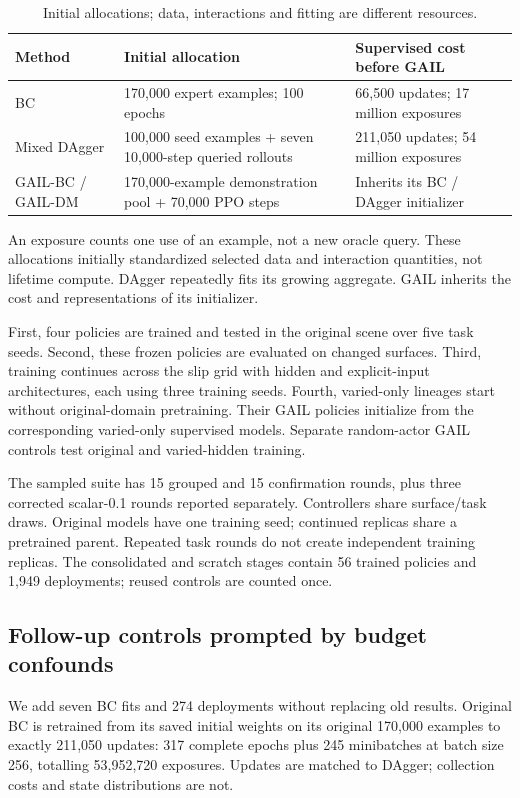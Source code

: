 \documentclass[conference]{IEEEtran}
\begin{document}
\begin{table}[t]\centering\small
\caption{Initial allocations; data, interactions and fitting are different resources.}
\begin{tabularx}{\textwidth}{lXX}\toprule
Method & Initial allocation & Supervised cost before GAIL \\
\midrule
BC & 170,000 expert examples; 100 epochs & 66,500 updates; 17 million exposures \\
Mixed DAgger & 100,000 seed examples + seven 10,000-step queried rollouts & 211,050 updates; 54 million exposures \\
GAIL-BC / GAIL-DM & 170,000-example demonstration pool + 70,000 PPO steps & Inherits its BC / DAgger initializer \\
\bottomrule\end{tabularx}\end{table}

An exposure counts one use of an example, not a new oracle query. These allocations initially standardized selected data and interaction quantities, not lifetime compute. DAgger repeatedly fits its growing aggregate. GAIL inherits the cost and representations of its initializer.

First, four policies are trained and tested in the original scene over five task seeds. Second, these frozen policies are evaluated on changed surfaces. Third, training continues across the slip grid with hidden and explicit-input architectures, each using three training seeds. Fourth, varied-only lineages start without original-domain pretraining. Their GAIL policies initialize from the corresponding varied-only supervised models. Separate random-actor GAIL controls test original and varied-hidden training.

The sampled suite has 15 grouped and 15 confirmation rounds, plus three corrected scalar-0.1 rounds reported separately. Controllers share surface/task draws. Original models have one training seed; continued replicas share a pretrained parent. Repeated task rounds do not create independent training replicas. The consolidated and scratch stages contain 56 trained policies and 1,949 deployments; reused controls are counted once.

\subsection{Follow-up controls prompted by budget confounds}

We add seven BC fits and 274 deployments without replacing old results. Original BC is retrained from its saved initial weights on its original 170,000 examples to exactly 211,050 updates: 317 complete epochs plus 245 minibatches at batch size 256, totalling 53,952,720 exposures. Updates are matched to DAgger; collection costs and state distributions are not.
\end{document}
